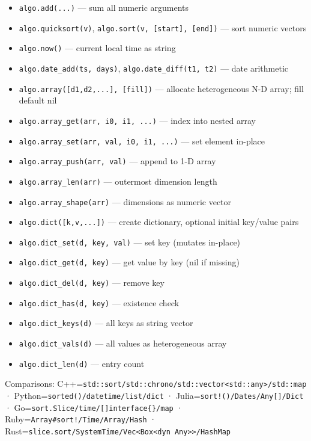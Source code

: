 \documentclass[
]{article}
\providecommand{\tightlist}{%
  \setlength{\itemsep}{0pt}\setlength{\parskip}{0pt}}
\begin{document}
\begin{itemize}
\tightlist
\item
  \texttt{algo.add(...)} --- sum all numeric arguments
\item
  \texttt{algo.quicksort(v)},
  \texttt{algo.sort(v,\ {[}start{]},\ {[}end{]})} --- sort numeric
  vectors
\item
  \texttt{algo.now()} --- current local time as string
\item
  \texttt{algo.date\_add(ts,\ days)}, \texttt{algo.date\_diff(t1,\ t2)}
  --- date arithmetic
\item
  \texttt{algo.array({[}d1,d2,...{]},\ {[}fill{]})} --- allocate
  heterogeneous N-D array; fill default nil
\item
  \texttt{algo.array\_get(arr,\ i0,\ i1,\ ...)} --- index into nested
  array
\item
  \texttt{algo.array\_set(arr,\ val,\ i0,\ i1,\ ...)} --- set element
  in-place
\item
  \texttt{algo.array\_push(arr,\ val)} --- append to 1-D array
\item
  \texttt{algo.array\_len(arr)} --- outermost dimension length
\item
  \texttt{algo.array\_shape(arr)} --- dimensions as numeric vector
\item
  \texttt{algo.dict({[}k,v,...{]})} --- create dictionary, optional
  initial key/value pairs
\item
  \texttt{algo.dict\_set(d,\ key,\ val)} --- set key (mutates in-place)
\item
  \texttt{algo.dict\_get(d,\ key)} --- get value by key (nil if missing)
\item
  \texttt{algo.dict\_del(d,\ key)} --- remove key
\item
  \texttt{algo.dict\_has(d,\ key)} --- existence check
\item
  \texttt{algo.dict\_keys(d)} --- all keys as string vector
\item
  \texttt{algo.dict\_vals(d)} --- all values as heterogeneous array
\item
  \texttt{algo.dict\_len(d)} --- entry count
\end{itemize}

Comparisons:
C++=\texttt{std::sort/std::chrono/std::vector\textless{}std::any\textgreater{}/std::map}
· Python=\texttt{sorted()/datetime/list/dict} ·
Julia=\texttt{sort!()/Dates/Any{[}{]}/Dict} ·
Go=\texttt{sort.Slice/time/{[}{]}interface\{\}/map} ·
Ruby=\texttt{Array\#sort!/Time/Array/Hash} ·
Rust=\texttt{slice.sort/SystemTime/Vec\textless{}Box\textless{}dyn\ Any\textgreater{}\textgreater{}/HashMap}
\end{document}
